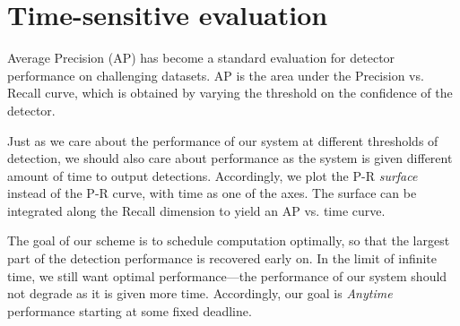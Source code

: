 \section{Time-sensitive evaluation} \label{sec:evaluation}
Average Precision (AP) has become a standard evaluation for detector performance on challenging datasets.
AP is the area under the Precision vs. Recall curve, which is obtained by varying the threshold on the confidence of the detector.

Just as we care about the performance of our system at different thresholds of detection, we should also care about performance as the system is given different amount of time to output detections.
Accordingly, we plot the P-R \emph{surface} instead of the P-R curve, with time as one of the axes.
The surface can be integrated along the Recall dimension to yield an AP vs. time curve.

The goal of our scheme is to schedule computation optimally, so that the largest part of the detection performance is recovered early on.
In the limit of infinite time, we still want optimal performance---the performance of our system should not degrade as it is given more time.
Accordingly, our goal is \emph{Anytime} performance starting at some fixed deadline.

